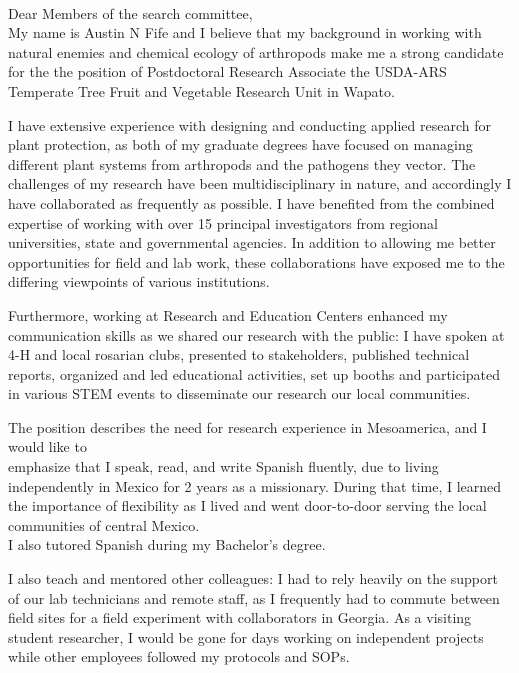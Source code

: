 \documentclass[11pt]{letter} %
\begin{document}
\begin{letter}
\\
Dear Members of the search committee,\\

My name is Austin N Fife and I believe that my background in working with natural enemies and chemical ecology of arthropods make me a strong candidate for the the position of Postdoctoral Research Associate the USDA-ARS Temperate Tree Fruit and Vegetable Research Unit in Wapato.

I have extensive experience with designing and conducting applied research for plant protection, as both of my graduate degrees have focused on managing different plant systems from arthropods and the pathogens they vector. The challenges of my research have been multidisciplinary in nature, and accordingly I have collaborated as frequently as possible. I have benefited from the combined expertise of working with over 15 principal investigators from regional universities, state and governmental agencies. In addition to allowing me better opportunities for field and lab work, these collaborations have exposed me to the differing viewpoints of various institutions.

Furthermore, working at Research and Education Centers enhanced my communication skills as we shared our research with the public: I have spoken at 4-H and local rosarian clubs, presented to stakeholders, published technical reports, organized and led educational activities, set up booths and participated in various STEM events to disseminate our research our local communities.

The position describes the need for research experience in Mesoamerica, and I would like to\\
emphasize that I speak, read, and write Spanish fluently, due to living independently in Mexico for 2 years as a missionary. During that time, I learned the importance of  flexibility as I lived and went door-to-door serving the local communities of central Mexico.\\
I also tutored Spanish during my Bachelor's degree.

I also teach and mentored other colleagues: I had to rely heavily on the support of our lab technicians and remote staff, as I frequently had to commute between field sites for a field experiment with collaborators in Georgia. As a visiting student researcher, I would be gone for days working on independent projects while other employees followed my protocols and SOPs.


\end{letter}
\end{document}
